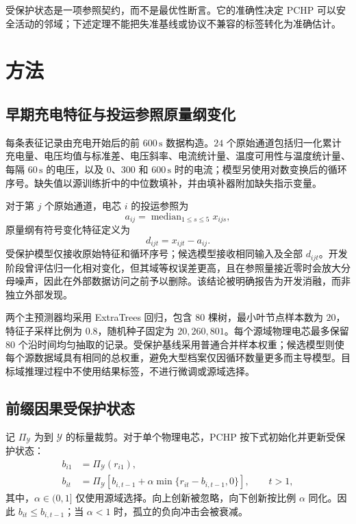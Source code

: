 \documentclass[UTF8,11pt]{ctexart}
\begin{document}
受保护状态是一项参照契约，而不是最优性断言。它的准确性决定 PCHP 可以安全活动的邻域；下述定理不能把失准基线或协议不兼容的标签转化为准确估计。

\section{方法}

\subsection{早期充电特征与投运参照原量纲变化}

每条表征记录由充电开始后的前 $600\,\mathrm{s}$ 数据构造。$24$ 个原始通道包括归一化累计充电量、电压均值与标准差、电压斜率、电流统计量、温度可用性与温度统计量、每隔 $60\,\mathrm{s}$ 的电压，以及 $0$、$300$ 和 $600\,\mathrm{s}$ 时的电流；模型另使用对数变换后的循环序号。缺失值以源训练折中的中位数填补，并由填补器附加缺失指示变量。

对于第 $j$ 个原始通道，电芯 $i$ 的投运参照为
\begin{equation}
  a_{ij}=\operatorname{median}_{1\leq s\leq5}x_{ijs},
\end{equation}
原量纲有符号变化特征定义为
\begin{equation}
  d_{ijt}=x_{ijt}-a_{ij}.
  \label{eq:change_zh}
\end{equation}
受保护模型仅接收原始特征和循环序号；候选模型接收相同输入及全部 $d_{ijt}$。开发阶段曾评估归一化相对变化，但其域等权误差更高，且在参照量接近零时会放大分母噪声，因此在外部数据访问之前予以删除。该结论被明确报告为开发消融，而非独立外部发现。

两个主预测器均采用 ExtraTrees 回归，包含 $80$ 棵树，最小叶节点样本数为 $20$，特征子采样比例为 $0.8$，随机种子固定为 $20{,}260{,}801$。每个源域物理电芯最多保留 $80$ 个沿时间均匀抽取的记录。受保护基线采用普通合并样本权重；候选模型则使每个源数据域具有相同的总权重，避免大型档案仅因循环数量更多而主导模型。目标域推理过程中不使用结果标签，不进行微调或源域选择。

\subsection{前缀因果受保护状态}

记 $\Pi_{\mathcal Y}$ 为到 $\mathcal Y$ 的标量裁剪。对于单个物理电芯，PCHP 按下式初始化并更新受保护状态：
\begin{align}
  b_{i1}&=\Pi_{\mathcal Y}(r_{i1}),\\
  b_{it}&=\Pi_{\mathcal Y}\!\left[b_{i,t-1}
  +\alpha\min\{r_{it}-b_{i,t-1},0\}\right],\qquad t>1,
  \label{eq:causal_state_zh}
\end{align}
其中，$\alpha\in(0,1]$ 仅使用源域选择。向上创新被忽略，向下创新按比例 $\alpha$ 同化。因此 $b_{it}\leq b_{i,t-1}$；当 $\alpha<1$ 时，孤立的负向冲击会被衰减。
\end{document}
